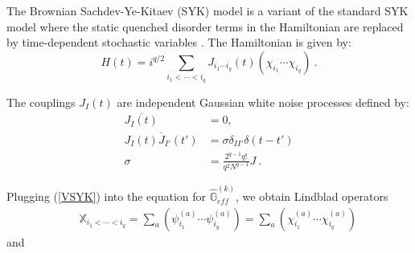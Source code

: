 \documentclass{article}
\theoremstyle{definition}
\newcommand{\nn}{\nonumber}
\newcommand{\lb}{\left(}
\newcommand{\rb}{\right)}
\begin{document}
    The Brownian Sachdev-Ye-Kitaev (SYK) model is a variant of the standard SYK
    model where the static quenched disorder terms in the Hamiltonian are
    replaced by time-dependent stochastic variables \cite{saad2018semiclassical}.
    The Hamiltonian is given by:
    \begin{equation}
        \label{SYKHam}H(t) = i^{q/2}\sum_{i_1<\cdots <i_q}J_{i_1\cdots i_q}(t) (\chi
        _{i_1}\cdots \chi_{i_q})\ .
    \end{equation}

    The couplings $J_{I}(t)$ are independent Gaussian white noise processes defined
    by:
    \begin{align}
        \overline{J_I(t)}            & = 0, \nonumber                      \\
        \overline{J_I(t) J_{I'}(t')} & = \sigma\delta_{II'}\delta(t-t')\nn \\
        \sigma                       & =\frac{2^{q-1}q!}{q^{2}N^{q-1}}J\ .
    \end{align}

    Plugging (\ref{VSYK}) into the equation for $\hat{\mathbb{G}}_{eff}^{(k)}$,
    we obtain Lindblad operators
    \begin{eqnarray}
        &&\mathbb{X}_{i_1<\cdots <i_q}=\sum_a (\psi_{i_1}^{(a)}\cdots \psi_{i_q}^{(a)})=\sum_a
        (\chi_{i_1}^{(a)}\cdots \chi_{i_q}^{(a)})
    \end{eqnarray}
    and



\end{document}
